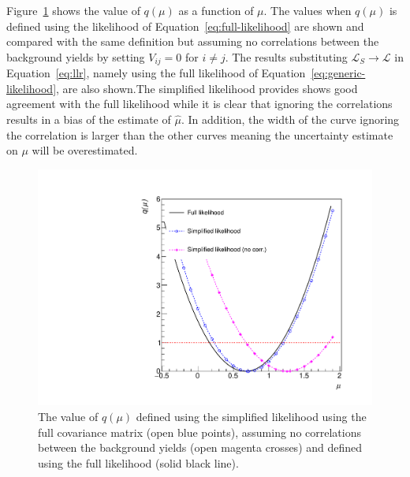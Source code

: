 Figure~\ref{fig:likelihoodscan} shows the value of $q(\mu)$ as a function of $\mu$. The values when $q(\mu)$ 
is defined using the likelihood of Equation~\ref{eq:full-likelihood} are shown and compared with the same definition but assuming no correlations between the 
background yields by setting $V_{ij}=0$ for $i\neq j$. The results substituting $\mathcal{L}_{S}\rightarrow\mathcal{L}$ in Equation~\ref{eq:llr}, 
namely using the full likelihood of Equation~\ref{eq:generic-likelihood}, are also shown.The simplified 
likelihood provides shows good agreement with the full likelihood while it is clear that ignoring the correlations results in a bias of the estimate of $\hat{\mu}$. In 
addition, the width of the curve ignoring the correlation is larger than the other curves meaning the uncertainty estimate on $\mu$ will be overestimated.  


\begin{figure}[hbt]
  \begin{center} 
   \includegraphics[width=1.5\cmsFigWidth]{figures/r.pdf}
   \caption{The value of $q(\mu)$ defined using the simplified likelihood using the full covariance matrix (open blue points), assuming no correlations between the 
   background yields (open magenta crosses) and defined using the full likelihood (solid black line).}
   \label{fig:likelihoodscan} 
  \end{center}
\end{figure}


